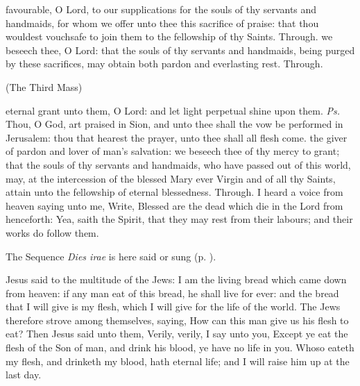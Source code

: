 \secret
{} favourable, O Lord, to our supplications for the souls of thy servants and handmaids, for whom we offer unto thee this sacrifice of praise: that thou wouldest vouchsafe to join them to the fellowship of thy Saints. Through.
\postcommunion
{} we beseech thee, O Lord: that the souls of thy servants and handmaids, being purged by these sacrifices, may obtain both pardon and everlasting rest. Through.

\centerline{\small{(The Third Mass)}}\label{AllSoulsIII}

\introit
{} eternal grant unto them, O Lord: and let light perpetual shine upon them. \textit{Ps.} Thou, O God, art praised in Sion, and unto thee shall the vow be performed in Jerusalem: thou that hearest the prayer, unto thee shall all flesh come.
\collect
{} the giver of pardon and lover of man's salvation: we beseech thee of thy mercy to grant; that the souls of thy servants and handmaids, who have passed out of this world, may, at the intercession of the blessed Mary ever Virgin and of all thy Saints, attain unto the fellowship of eternal blessedness. Through.
 I heard a voice from heaven saying unto me, Write, Blessed are the dead which die in the Lord from henceforth: Yea, saith the Spirit, that they may rest from their labours; and their works do follow them.
\begin{rubric}
    The Sequence \emph{Dies irae} is here said or sung (p. \pageref{diesirae}).
\end{rubric}
 Jesus said to the multitude of the Jews: I am the living bread which came down from heaven: if any man eat of this bread, he shall live for ever: and the bread that I will give is my flesh, which I will give for the life of the world. The Jews therefore strove among themselves, saying, How can this man give us his flesh to eat? Then Jesus said unto them, Verily, verily, I say unto you, Except ye eat the flesh of the Son of man, and drink his blood, ye have no life in you. Whoso eateth my flesh, and drinketh my blood, hath eternal life; and I will raise him up at the last day.
